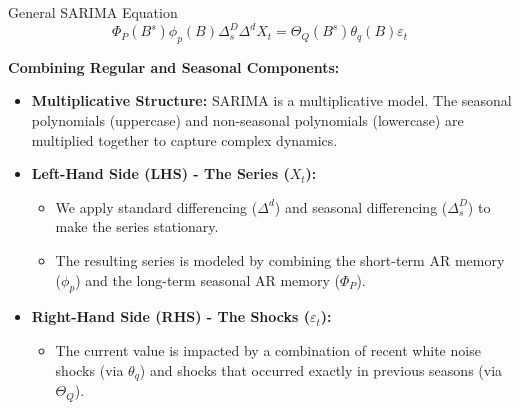 \documentclass[aspectratio=169]{beamer}
\begin{document}
\begin{frame}{General SARIMA Equation}
\[
\Phi_P(B^s) \phi_p(B) \Delta_s^D \Delta^d X_t = \Theta_Q(B^s) \theta_q(B) \varepsilon_t
\]

\textbf{Combining Regular and Seasonal Components:}
\begin{itemize}
    \item \textbf{Multiplicative Structure:} SARIMA is a multiplicative model. The seasonal polynomials (uppercase) and non-seasonal polynomials (lowercase) are multiplied together to capture complex dynamics.
    
    \vspace{0.3cm}
    
    \item \textbf{Left-Hand Side (LHS) - The Series ($X_t$):}
    \begin{itemize}
        \item We apply standard differencing ($\Delta^d$) and seasonal differencing ($\Delta_s^D$) to make the series stationary.
        \item The resulting series is modeled by combining the short-term AR memory ($\phi_p$) and the long-term seasonal AR memory ($\Phi_P$).
    \end{itemize}
    
    \vspace{0.3cm}
    
    \item \textbf{Right-Hand Side (RHS) - The Shocks ($\varepsilon_t$):}
    \begin{itemize}
        \item The current value is impacted by a combination of recent white noise shocks (via $\theta_q$) and shocks that occurred exactly in previous seasons (via $\Theta_Q$).
    \end{itemize}
\end{itemize}
\end{frame}
\end{document}
